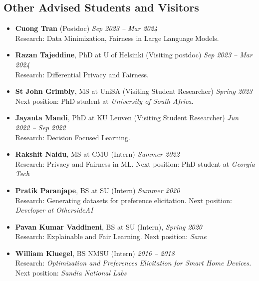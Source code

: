\subsection*{Other Advised Students and Visitors}
\begin{itemize}
  \item \textbf{Cuong Tran} ({\sc Postdoc}) 
  \hfill{\em Sep 2023 -- Mar 2024}\\
  {\sc Research}: Data Minimization, Fairness in Large Language Models.

    \item \textbf{Razan Tajeddine}, PhD at U of Helsinki ({\sc Visiting postdoc}) 
  \hfill{\em Sep 2023 -- Mar 2024}\\
  {\sc Research}: Differential Privacy and Fairness.

  \item \textbf{St John Grimbly}, MS at UniSA ({\sc Visiting Student Researcher}) 
  \hfill{\em Spring 2023}\\
  {\sc Next position:} PhD student at \textit{University of South Africa}.

  \item \textbf{Jayanta Mandi}, PhD at KU Leuven ({\sc Visiting Student Researcher}) 
  \hfill{\em Jun 2022 -- Sep 2022}\\
  {\sc Research}: Decision Focused Learning.

  \item \textbf{Rakshit Naidu}, MS at CMU ({\sc Intern}) \hfill{\em Summer 2022}\\
  {\sc Research:} Privacy and Fairness in ML. 
  {\sc Next position:} PhD student at \textit{Georgia Tech}

  \item \textbf{Pratik Paranjape}, BS at SU ({\sc Intern}) 
  \hfill{\em Summer 2020}\\
  {\sc Research}: Generating datasets for preference elicitation. 
  {\sc Next position:} \textit{Developer at OthersideAI}

  \item \textbf{Pavan Kumar Vaddineni},  BS at SU ({\sc Intern}), \hfill{\em Spring 2020}\\
  {\sc Research}: Explainable and Fair Learning. 
  {\sc Next position:} \textit{Same}

  \item \textbf{William Kluegel}, BS NMSU ({\sc Intern}) \hfill{\em 2016 -- 2018} \\
  {\sc Research}: \textit{Optimization and Preferences Elicitation for Smart Home Devices.}
  {\sc Next position:} \textit{Sandia National Labs}
\end{itemize}

